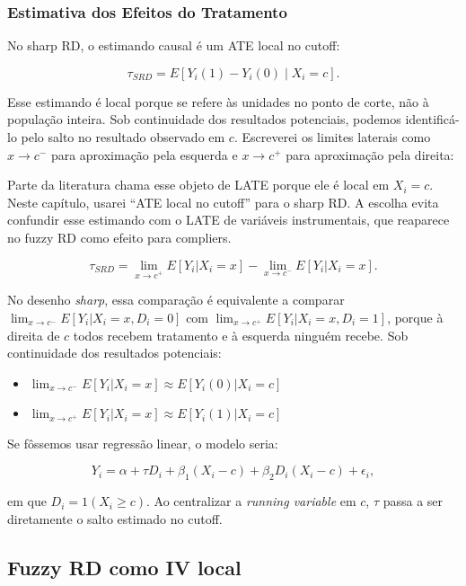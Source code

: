 \documentclass[
]{article}
\providecommand{\tightlist}{%
  \setlength{\itemsep}{0pt}\setlength{\parskip}{0pt}}
\begin{document}
\subsubsection{Estimativa dos Efeitos do Tratamento}\label{estimativa-dos-efeitos-do-tratamento}

No sharp RD, o estimando causal é um ATE local no cutoff:

\[
\tau_{SRD} = E[Y_i(1)-Y_i(0)\mid X_i=c].
\]

Esse estimando é local porque se refere às unidades no ponto de corte, não à população inteira. Sob continuidade dos resultados potenciais, podemos identificá-lo pelo salto no resultado observado em \(c\). Escreverei os limites laterais como \(x \to c^-\) para aproximação pela esquerda e \(x \to c^+\) para aproximação pela direita:

Parte da literatura chama esse objeto de LATE porque ele é local em \(X_i=c\). Neste capítulo, usarei ``ATE local no cutoff'' para o sharp RD. A escolha evita confundir esse estimando com o LATE de variáveis instrumentais, que reaparece no fuzzy RD como efeito para compliers.

\[
\tau_{SRD} = \lim_{x \to c^+} E[Y_i|X_i=x] - \lim_{x \to c^-} E[Y_i|X_i=x].
\]

No desenho \emph{sharp}, essa comparação é equivalente a comparar \(\lim_{x \to c^-} E[Y_i | X_i = x, D_i=0]\) com \(\lim_{x \to c^+} E[Y_i | X_i = x, D_i=1]\), porque à direita de \(c\) todos recebem tratamento e à esquerda ninguém recebe. Sob continuidade dos resultados potenciais:

\begin{itemize}
\tightlist
\item
  \(\lim_{x \to c^-} E[Y_i | X_i = x] \approx E[Y_i(0) | X_i = c]\)
\item
  \(\lim_{x \to c^+} E[Y_i | X_i = x] \approx E[Y_i(1) | X_i = c]\)
\end{itemize}

Se fôssemos usar regressão linear, o modelo seria:

\[
Y_i = \alpha + \tau D_i + \beta_1(X_i-c) + \beta_2D_i(X_i-c) + \epsilon_i,
\]

em que \(D_i = 1(X_i \geq c)\). Ao centralizar a \emph{running variable} em \(c\), \(\tau\) passa a ser diretamente o salto estimado no cutoff.

\subsection{Fuzzy RD como IV local}\label{fuzzy-rd-como-iv-local}
\end{document}
